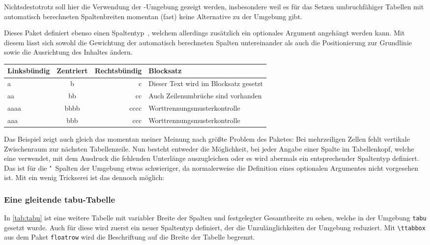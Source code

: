 \documentclass[%
  english,ngerman,%
  cdgeometry=no,DIV=12,automark,%
]{tudscrartcl}
\makeatletter
\newcommand*\pcolumnfuzz[1]{\pretocmd{\@endpbox}{\hfuzz=#1}{}{}}
\makeatother
\begin{document}
Nichtsdestotrotz soll hier die Verwendung der -Umgebung 
gezeigt werden, insbesondere weil es für das Setzen umbruchfähiger Tabellen mit 
automatisch berechneten Spaltenbreiten momentan (fast) keine Alternative zu der 
Umgebung  gibt. 

Dieses Paket definiert ebenso einen Spaltentyp~, welchem allerdings 
zusätzlich ein optionales Argument angehängt werden kann. Mit diesem lässt sich 
sowohl die Gewichtung der automatisch berechneten Spalten untereinander als 
auch die Positionierung zur Grundlinie sowie die Ausrichtung des Inhaltes 
ändern.
%
\begingroup
\pcolumnfuzz{70pt}
\begin{Hint*}
\begin{tabu} to 11.7cm {lcrX}
\toprule
\textbf{Linksbündig} & \textbf{Zentriert} & 
\textbf{Rechtsbündig} & \textbf{Blocksatz} \tabularnewline
\midrule
a    & b    & c    & Dieser Text wird im Blocksatz gesetzt\tabularnewline
aa   & bb   & cc   & Auch Zeilenumbrüche sind vorhanden\tabularnewline
aaaa & bbbb & cccc & Worttrennungsmus\-terkontrolle\tabularnewline
aaa  & bbb  & ccc  & Worttrennungsmusterkontrolle\tabularnewline
\bottomrule
\end{tabu}
\end{Hint*}
\endgroup
%
Das Beispiel zeigt auch gleich das momentan meiner Meinung nach größte Problem 
des Paketes: Bei mehrzeiligen Zellen fehlt vertikale Zwischenraum zur nächsten 
Tabellenzeile. Nun besteht entweder die Möglichkeit, bei jeder Angabe einer 
Spalte im Tabellenkopf, welche eine  verwendet, mit dem Ausdruck 
 die fehlenden Unterlänge auszugleichen 
oder es wird abermals ein entsprechender Spaltentyp definiert. Das ist für 
die "~Spalten der Umgebung  etwas schwieriger, da 
 normalerweise die Definition eines optionalen Argumentes 
nicht vorgesehen ist. Mit ein wenig Trickserei ist das dennoch möglich:
%
\begin{Trunk+}
\subsubsection{Eine gleitende tabu-Tabelle}
In \autoref{tab:tabu} ist eine weitere Tabelle mit variabler Breite der 
Spalten und festgelegter Gesamtbreite zu sehen, welche in der Umgebung 
\texttt{tabu} gesetzt wurde. Auch für diese wird zuerst ein neuer 
Spaltentyp definiert, der die Unzulänglichkeiten der Umgebung reduziert. 
Mit \texttt{\textbackslash ttabbox} aus dem Paket \texttt{floatrow} wird 
die Beschriftung auf die Breite der Tabelle begrenzt.

\end{Trunk+}
\end{document}
